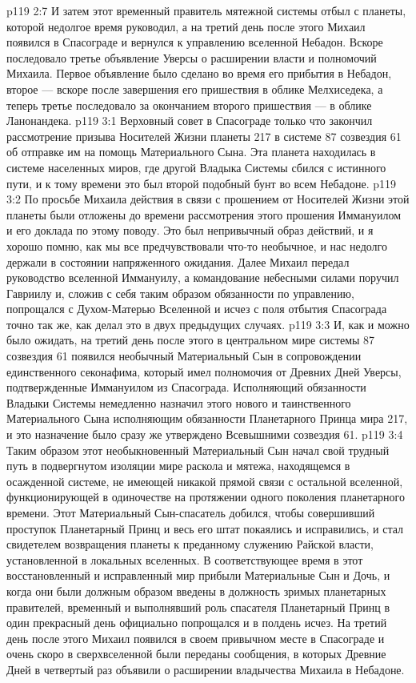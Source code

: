\vs p119 2:7 И затем этот временный правитель мятежной системы отбыл с планеты, которой недолгое время руководил, а на третий день после этого Михаил появился в Спасограде и вернулся к управлению вселенной Небадон. Вскоре последовало третье объявление Уверсы о расширении власти и полномочий Михаила. Первое объявление было сделано во время его прибытия в Небадон, второе --- вскоре после завершения его пришествия в облике Мелхиседека, а теперь третье последовало за окончанием второго пришествия --- в облике Ланонандека.
\vs p119 3:1 Верховный совет в Спасограде только что закончил рассмотрение призыва Носителей Жизни планеты 217 в системе 87 созвездия 61 об отправке им на помощь Материального Сына. Эта планета находилась в системе населенных миров, где другой Владыка Системы сбился с истинного пути, и к тому времени это был второй подобный бунт во всем Небадоне.
\vs p119 3:2 По просьбе Михаила действия в связи с прошением от Носителей Жизни этой планеты были отложены до времени рассмотрения этого прошения Иммануилом и его доклада по этому поводу. Это был непривычный образ действий, и я хорошо помню, как мы все предчувствовали что\hyp{}то необычное, и нас недолго держали в состоянии напряженного ожидания. Далее Михаил передал руководство вселенной Иммануилу, а командование небесными силами поручил Гавриилу и, сложив с себя таким образом обязанности по управлению, попрощался с Духом\hyp{}Матерью Вселенной и исчез с поля отбытия Спасограда точно так же, как делал это в двух предыдущих случаях.
\vs p119 3:3 И, как и можно было ожидать, на третий день после этого в центральном мире системы 87 созвездия 61 появился необычный Материальный Сын в сопровождении единственного секонафима, который имел полномочия от Древних Дней Уверсы, подтвержденные Иммануилом из Спасограда. Исполняющий обязанности Владыки Системы немедленно назначил этого нового и таинственного Материального Сына исполняющим обязанности Планетарного Принца мира 217, и это назначение было сразу же утверждено Всевышними созвездия 61.
\vs p119 3:4 Таким образом этот необыкновенный Материальный Сын начал свой трудный путь в подвергнутом изоляции мире раскола и мятежа, находящемся в осажденной системе, не имеющей никакой прямой связи с остальной вселенной, функционирующей в одиночестве на протяжении одного поколения планетарного времени. Этот Материальный Сын\hyp{}спасатель добился, чтобы совершивший проступок Планетарный Принц и весь его штат покаялись и исправились, и стал свидетелем возвращения планеты к преданному служению Райской власти, установленной в локальных вселенных. В соответствующее время в этот восстановленный и исправленный мир прибыли Материальные Сын и Дочь, и когда они были должным образом введены в должность зримых планетарных правителей, временный и выполнявший роль спасателя Планетарный Принц в один прекрасный день официально попрощался и в полдень исчез. На третий день после этого Михаил появился в своем привычном месте в Спасограде и очень скоро в сверхвселенной были переданы сообщения, в которых Древние Дней в четвертый раз объявили о расширении владычества Михаила в Небадоне.
